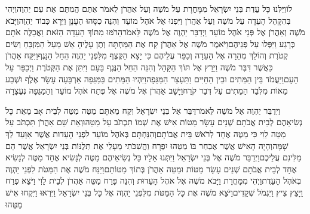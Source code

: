 \documentclass[../main/main.tex]{subfiles}
\begin{document}
\begin{multicols*}{\ncols}
לוֹ\PreVerseSpace{}וַיַּלִּנוּ\SubEnd{} כָּל עֲדַת בְּנֵי יִשְׂרָאֵל מִמָּחֳרָת עַל מֹשֶׁה וְעַל אַהֲרֹן לֵאמֹר אַתֶּם הֲמִתֶּם אֶת עַם יַהְוֶה\PreVerseSpace{}וַיְהִי בְּהִקָּהֵל הָעֵדָה עַל מֹשֶׁה וְעַל אַהֲרֹן וַיִּפְנוּ אֶל אֹהֶל מוֹעֵד וְהִנֵּה כִסָּהוּ הֶעָנָן וַיֵּרָא כְּבוֹד יַהְוֶה\PreVerseSpace{}וַיָּבֹא מֹשֶׁה וְאַהֲרֹן אֶל פְּנֵי אֹהֶל מוֹעֵד \ClosedSection{}וַיְדַבֵּר יַהְוֶה אֶל מֹשֶׁה לֵּאמֹר\PreVerseSpace{}הֵרֹמּוּ מִתּוֹךְ הָעֵדָה הַזֹּאת וַאֲכַלֶּה אֹתָם כְּרָגַע וַיִּפְּלוּ עַל פְּנֵיהֶם\PreVerseSpace{}וַיֹּאמֶר מֹשֶׁה אֶל אַהֲרֹן קַח אֶת הַמַּחְתָּה וְתֶן עָלֶיהָ אֵשׁ מֵעַל הַמִּזְבֵּחַ וְשִׂים קְטֹרֶת וְהוֹלֵךְ מְהֵרָה אֶל הָעֵדָה וְכַפֵּר עֲלֵיהֶם כִּי יָצָא הַקֶּצֶף מִלִּפְנֵי יַהְוֶה הֵחֵל הַנָּגֶף\PreVerseSpace{}וַיִּקַּח אַהֲרֹן כַּאֲשֶׁר דִּבֶּר מֹשֶׁה וַיָּרָץ אֶל תּוֹךְ הַקָּהָל וְהִנֵּה הֵחֵל הַנֶּגֶף בָּעָם וַיִּתֵּן אֶת הַקְּטֹרֶת וַיְכַפֵּר עַל הָעָם\PreVerseSpace{}וַיַּעֲמֹד בֵּין הַמֵּתִים וּבֵין הַחַיִּים וַתֵּעָצַר הַמַּגֵּפָה\PreVerseSpace{}וַיִּהְיוּ הַמֵּתִים בַּמַּגֵּפָה אַרְבָּעָה עָשָׂר אֶלֶף וּשְׁבַע מֵאוֹת מִלְּבַד הַמֵּתִים עַל דְּבַר קֹרַח\PreVerseSpace{}וַיָּשָׁב אַהֲרֹן אֶל מֹשֶׁה אֶל פֶּתַח אֹהֶל מוֹעֵד וְהַמַּגֵּפָה נֶעֱצָרָה\OpenSection{}\par
{}וַיְדַבֵּר יַהְוֶה אֶל מֹשֶׁה לֵּאמֹר\PreVerseSpace{}דַּבֵּר אֶל בְּנֵי יִשְׂרָאֵל וְקַח מֵאִתָּם מַטֶּה מַטֶּה לְבֵית אָב מֵאֵת כָּל נְשִׂיאֵהֶם לְבֵית אֲבֹתָם שְׁנֵים עָשָׂר מַטּוֹת אִישׁ אֶת שְׁמוֹ תִּכְתֹּב עַל מַטֵּהוּ\PreVerseSpace{}וְאֵת שֵׁם אַהֲרֹן תִּכְתֹּב עַל מַטֵּה לֵוִי כִּי מַטֶּה אֶחָד לְרֹאשׁ בֵּית אֲבוֹתָם\PreVerseSpace{}וְהִנַּחְתָּם בְּאֹהֶל מוֹעֵד לִפְנֵי הָעֵדוּת אֲשֶׁר אִוָּעֵד לְךָ\SubEnd{} שָׁמָּה\PreVerseSpace{}וְהָיָה הָאִישׁ אֲשֶׁר אֶבְחַר בּוֹ מַטֵּהוּ יִפְרָח וַהֲשִׁכֹּתִי מֵעָלַי אֶת תְּלֻנּוֹת בְּנֵי יִשְׂרָאֵל אֲשֶׁר הֵם מַלִּינִם עֲלֵיכֶם\PreVerseSpace{}וַיְדַבֵּר מֹשֶׁה אֶל בְּנֵי יִשְׂרָאֵל וַיִּתְּנוּ אֵלָיו כָּל נְשִׂיאֵיהֶם מַטֶּה לְנָשִׂיא אֶחָד מַטֶּה לְנָשִׂיא אֶחָד לְבֵית אֲבֹתָם שְׁנֵים עָשָׂר מַטּוֹת וּמַטֵּה אַהֲרֹן בְּתוֹךְ מַטּוֹתָם\PreVerseSpace{}וַיַּנַּח מֹשֶׁה אֶת הַמַּטֹּת לִפְנֵי יַהְוֶה בְּאֹהֶל הָעֵדֻת\PreVerseSpace{}וַיְהִי מִמָּחֳרָת וַיָּבֹא מֹשֶׁה אֶל אֹהֶל הָעֵדוּת וְהִנֵּה פָּרַח מַטֵּה אַהֲרֹן לְבֵית לֵוִי וַיֹּצֵא פֶרַח וַיָּצֵץ צִיץ וַיִּגְמֹל שְׁקֵדִים\PreVerseSpace{}וַיֹּצֵא מֹשֶׁה אֶת כָּל הַמַּטֹּת מִלִּפְנֵי יַהְוֶה אֶל כָּל בְּנֵי יִשְׂרָאֵל וַיִּרְאוּ וַיִּקְחוּ אִישׁ מַטֵּהוּ\OpenSection{}\par

\end{multicols*}
\end{document}
